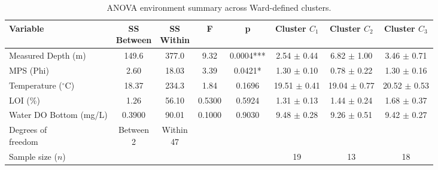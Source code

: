 \begin{table}[htbp]
  \centering
  \caption[ANOVA Environment (Ward Clustering)]{ANOVA environment summary across Ward-defined clusters.}
  \label{tab:WardsClustering_tables_anova_env}
  \scriptsize
  \setlength{\tabcolsep}{2pt}
  \renewcommand{\arraystretch}{1.08}
  \begin{tabular*}{\textwidth}{@{\extracolsep{\fill}}lccccccc@{}}
    \toprule
    Variable & \makecell[c]{SS\\Between} & \makecell[c]{SS\\Within} & F & p & \makecell[c]{Cluster\\$C_{1}$} & \makecell[c]{Cluster\\$C_{2}$} & \makecell[c]{Cluster\\$C_{3}$} \\
    \midrule
    Measured Depth (m) & 149.6 & 377.0 & 9.32 & 0.0004*** & 2.54 $\pm$ 0.44 & 6.82 $\pm$ 1.00 & 3.46 $\pm$ 0.71 \\
    MPS (Phi) & 2.60 & 18.03 & 3.39 & 0.0421* & 1.30 $\pm$ 0.10 & 0.78 $\pm$ 0.22 & 1.30 $\pm$ 0.16 \\
    Temperature ($^{\circ}$C) & 18.37 & 234.3 & 1.84 & 0.1696 & 19.51 $\pm$ 0.41 & 19.04 $\pm$ 0.77 & 20.52 $\pm$ 0.53 \\
    LOI (\%) & 1.26 & 56.10 & 0.5300 & 0.5924 & 1.31 $\pm$ 0.13 & 1.44 $\pm$ 0.24 & 1.68 $\pm$ 0.37 \\
    Water DO Bottom (mg/L) & 0.3900 & 90.01 & 0.1000 & 0.9030 & 9.48 $\pm$ 0.28 & 9.26 $\pm$ 0.51 & 9.42 $\pm$ 0.27 \\
    \midrule
    \makecell[l]{Degrees of\\freedom} & \makecell[c]{Between\\2} & \makecell[c]{Within\\47} &  &  &  &  &  \\
    Sample size ($n$) &  &  &  &  & 19 & 13 & 18 \\
    \bottomrule
  \end{tabular*}
\end{table}
